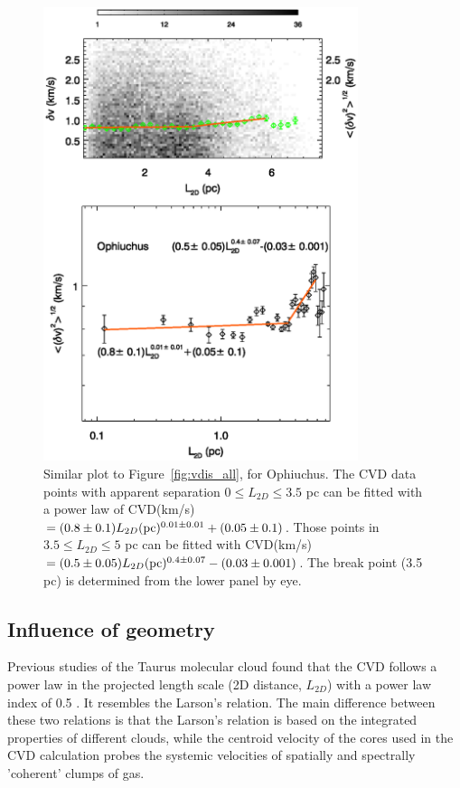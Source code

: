 \documentclass[iop,revtex4]{emulateapj}
\begin{document}
\begin{figure}[htbp]
\begin{minipage}[b]{0.45\textwidth}
  \includegraphics[width=9.2cm]{oph_vdis_all_all.eps}
\end{minipage}
\caption{Similar plot to Figure~\ref{fig:vdis_all}, for Ophiuchus. The CVD data points with apparent separation $0\leq L_{2D} \leq 3.5$  pc can be fitted with a power law of CVD(km/s)$=(0.8\pm 0.1)L_{2D} ({\rm pc})^{0.01\pm 0.01}+(0.05\pm 0.1)$. Those points in $3.5\leq L_{2D} \leq 5$  pc can be fitted with CVD(km/s)$=(0.5\pm 0.05)L_{2D} ({\rm pc})^{0.4\pm 0.07}-(0.03\pm 0.001)$. The break point (3.5 pc) is determined from the lower panel by eye.}\label{fig:oph_vdis_all}
\end{figure}




\subsection{Influence of geometry}
\label{sec:geometry}

Previous studies of the Taurus molecular cloud found that the CVD follows a power law in the projected length scale (2D distance, $L_{2D}$) with a power law index of 0.5 \citep{Qian2012}. It resembles the Larson's relation. The main difference between these two relations is that the Larson's relation is based on the integrated properties of different clouds, while the centroid velocity of the cores used in the CVD calculation probes the systemic velocities of spatially and spectrally 'coherent' clumps of gas.
\end{document}

